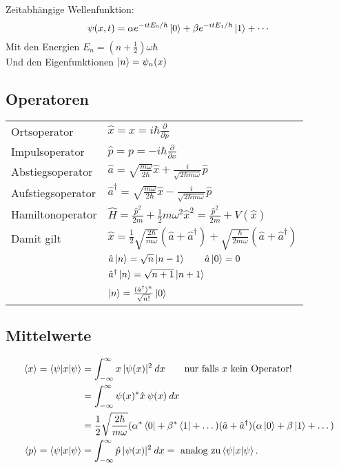 \documentclass[landscape,8pt]{scrartcl}
\begin{document}
\begin{multicols}{3}

\noindent Zeitabhängige Wellenfunktion:
\[
	\psi(x,t)
		= \alpha e^{-itE_0/\hbar}\ket 0 
		+ \beta  e^{-itE_1/\hbar}\ket 1  
		+ \cdots
\]
Mit den Energien $E_n = \left(n+\frac 12\right) \omega \hbar $ \\
Und den Eigenfunktionen $\ket n = \psi_n(x)$\\

\subsection{Operatoren}
\begin{tabular}{ll}
Ortsoperator 			& $\hat x = x = i \hbar \frac{\partial}{\partial p}$	\\
Impulsoperator 			& $\hat p = p = -i\hbar \frac{\partial}{\partial x}$	\\
Abstiegsoperator 		& $\hat a = \sqrt{\frac{m \omega}{2\hbar}} \hat x + \frac{i}{\sqrt{2\hbar m \omega}} \hat p$	\\
Aufstiegsoperator 		& $\hat a^\dagger = \sqrt{\frac{m \omega}{2\hbar}} \hat x - \frac{i}{\sqrt{2\hbar m \omega}} \hat p$ \\
Hamiltonoperator		& $\hat H=\frac{\hat p^2}{2m}+\frac{1}{2}m\omega^2\hat x^2 = \frac{\hat p^2}{2m} + V(\hat x)$	\\
Damit gilt				& $\hat x  = \frac 12 \sqrt{\frac{2\hbar}{m\omega}}(\hat a + \hat a^\dagger) + \sqrt{\frac{\hbar}{2m\omega}}(\hat a + \hat a^\dagger)$	\\
						& $\hat a\ket n = \sqrt{n}\ket{n-1} \qquad \hat a \ket 0 = 0$ \\
						& $\hat a^\dagger \ket n = \sqrt{n+1}\ket {n+1}$	\\
						& $\ket n = \frac{(\hat a^\dagger)^n}{\sqrt {n!}} \ket 0 $
\end{tabular}

\subsection{Mittelwerte}
\begin{align*}
\braket{x}=\braket{\psi|x|\psi}	&=\int_{-\infty}^{\infty} x\:|\psi(x)|^2\:dx\qquad\text{nur falls } x \text{ kein Operator!}\\
								&=\int_{-\infty}^{\infty} \psi(x)^\ast \hat x\:\psi(x)\:dx		\\
								&=\frac 12 \sqrt{\frac{2\hbar}{m\omega}}(\alpha^\ast \bra 0 + \beta^\ast \bra 1 + \dots) (\hat a + \hat a^\dagger) (\alpha \ket 0 + \beta \ket 1 + \dots) \\
\braket{p}=\braket{\psi|x|\psi}	&=\int_{-\infty}^{\infty} \hat p\:|\psi(x)|^2\:dx= \text{ analog zu}\braket{\psi|x|\psi}\text{.}	\\
\end{align*}



\end{multicols}
\end{document}
